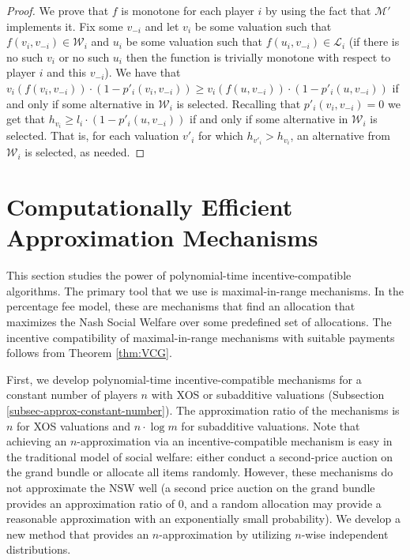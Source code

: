 \documentclass{article}
\newcommand{\cM}{{\mathcal M}}
\begin{document}
\begin{proof}
We prove that $f$ is monotone for each player $i$ by using the fact that $\cM'$ implements it. Fix some $v_{-i}$ and let $v_i$ be some valuation such that $f(v_i,v_{-i})\in \mathcal W_i$ and $u_i$ be some valuation such that $f(u_i,v_{-i})\in \mathcal L_i$ (if there is no such $v_i$ or no such $u_i$ then the function is trivially monotone with respect to player $i$ and this $v_{-i}$). We have that $v_i(f(v_i,v_{-i}))\cdot (1-p'_i(v_i,v_{-i})) \geq v_i(f(u,v_{-i}))\cdot (1-p'_i(u,v_{-i}))$ if and only if some alternative in $\mathcal W_i$ is selected. Recalling that $p'_i(v_i,v_{-i})=0$ we get that $h_{v_i}\geq l_i\cdot (1-p'_i(u,v_{-i}))$ if and only if some alternative in $\mathcal W_i$ is selected. That is, for each valuation $v'_i$ for which $h_{v'_i} > h_{v_i}$, an alternative from $\mathcal W_i$ is selected, as needed.
\end{proof}















\section{Computationally Efficient Approximation Mechanisms}\label{sec-approximations}

This section studies the power of polynomial-time incentive-compatible algorithms. The primary tool that we use is maximal-in-range mechanisms. In the percentage fee model, these are mechanisms that find an allocation that maximizes the Nash Social Welfare over some predefined set of allocations. The incentive compatibility of maximal-in-range mechanisms with suitable payments follows from Theorem \ref{thm:VCG}.

First, we develop polynomial-time incentive-compatible mechanisms for a constant number of players $n$ with XOS or subadditive valuations (Subsection \ref{subsec-approx-constant-number}). The approximation ratio of the mechanisms is $n$ for XOS valuations and $n\cdot\log m$ for subadditive valuations. Note that achieving an $n$-approximation via an  incentive-compatible mechanism is easy in the traditional model of social welfare: either conduct a second-price auction on the grand bundle or allocate all items randomly. However, these mechanisms do not approximate the NSW well (a second price auction on the grand bundle provides an approximation ratio of $0$, and a random allocation may provide a reasonable approximation with an exponentially small probability). We develop a new method that provides an $n$-approximation by utilizing $n$-wise independent distributions.
\end{document}
